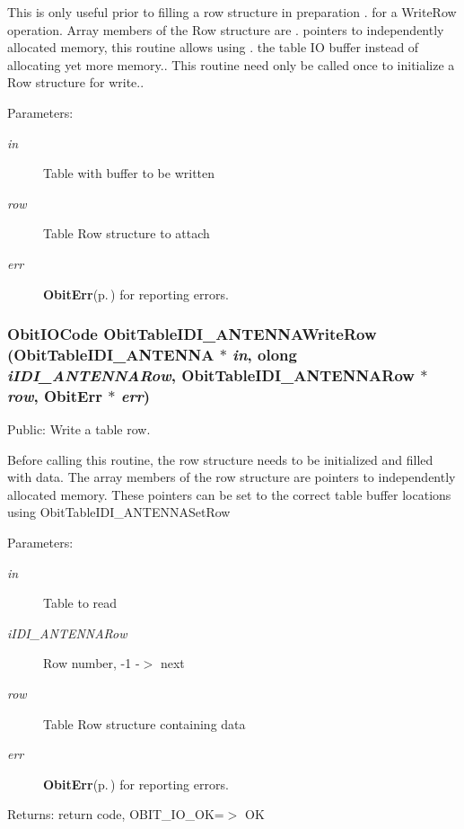 This is only useful prior to filling a row structure in preparation . for a Write\-Row operation. Array members of the Row structure are . pointers to independently allocated memory, this routine allows using . the table IO buffer instead of allocating yet more memory.. This routine need only be called once to initialize a Row structure for write.. \begin{Desc}
\item[Parameters:]
\begin{description}
\item[{\em in}]Table with buffer to be written \item[{\em row}]Table Row structure to attach \item[{\em err}]{\bf Obit\-Err}{\rm (p.\,\pageref{structObitErr})} for reporting errors. \end{description}
\end{Desc}
\subsubsection{\setlength{\rightskip}{0pt plus 5cm}Obit\-IOCode Obit\-Table\-IDI\_\-ANTENNAWrite\-Row ({\bf Obit\-Table\-IDI\_\-ANTENNA} $\ast$ {\em in}, {\bf olong} {\em i\-IDI\_\-ANTENNARow}, {\bf Obit\-Table\-IDI\_\-ANTENNARow} $\ast$ {\em row}, {\bf Obit\-Err} $\ast$ {\em err})}\label{ObitTableIDI__ANTENNA_8c_a24}


Public: Write a table row. 

Before calling this routine, the row structure needs to be initialized and filled with data. The array members of the row structure are pointers to independently allocated memory. These pointers can be set to the correct table buffer locations using Obit\-Table\-IDI\_\-ANTENNASet\-Row \begin{Desc}
\item[Parameters:]
\begin{description}
\item[{\em in}]Table to read \item[{\em i\-IDI\_\-ANTENNARow}]Row number, -1 -$>$ next \item[{\em row}]Table Row structure containing data \item[{\em err}]{\bf Obit\-Err}{\rm (p.\,\pageref{structObitErr})} for reporting errors. \end{description}
\end{Desc}
\begin{Desc}
\item[Returns:]return code, OBIT\_\-IO\_\-OK=$>$ OK \end{Desc}
